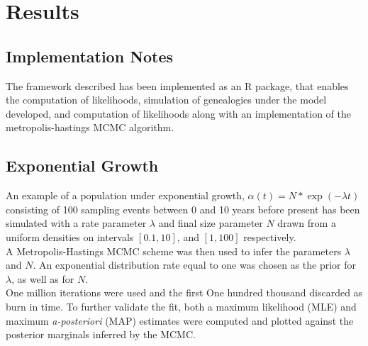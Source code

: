 \documentclass{report}
\theoremstyle{definition}
\begin{document}
\chapter{Results}
\section{Implementation Notes}
The framework described has been implemented as an R package, that enables the computation of likelihoods, simulation of genealogies under the model developed, and computation of likelihoods along with an implementation of the metropolis-hastings MCMC algorithm.
\section{Exponential Growth}
An example of a population under exponential growth, $\alpha(t) = N*\exp(-\lambda t)$ consisting of 100 sampling events between 0 and 10 years before present has been simulated with a rate parameter $\lambda$ and final size parameter $N$ drawn from a uniform densities on intervals $[0.1, 10]$, and $[1,100]$ respectively.\\
A Metropolis-Hastings MCMC scheme was then used to infer the parameters $\lambda$ and $N$. An exponential distribution rate equal to one was chosen as the prior for $\lambda$, as well as for $N$.\\
One million iterations were used and the first One hundred thousand discarded as burn in time. To further validate the fit, both a maximum likelihood (MLE) and maximum \textit{a-posteriori} (MAP) estimates were computed and plotted against the posterior marginals inferred by the MCMC.
\end{document}
